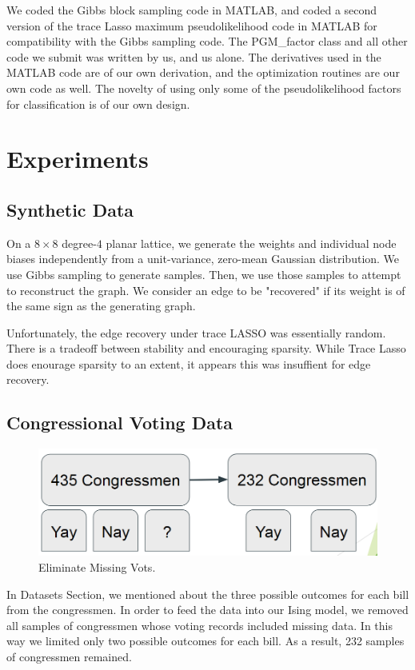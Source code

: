 \documentclass[11pt]{article}
\begin{document}
We coded the Gibbs block sampling code in MATLAB, and coded a second version of the trace Lasso maximum pseudolikelihood code in MATLAB for compatibility with the Gibbs sampling code. The PGM\_factor class and all other code we submit was written by us, and us alone.  The derivatives used in the MATLAB code are of our own derivation, and the optimization routines are our own code as well. The novelty of using only some of the pseudolikelihood factors for classification is of our own design.

\section{Experiments}
\subsection{Synthetic Data}
On a $8\times8$ degree-$4$ planar lattice, we generate the weights and individual node biases independently from a unit-variance, zero-mean Gaussian distribution.
We use Gibbs sampling to generate samples.
Then, we use those samples to attempt to reconstruct the graph. We consider an edge to be "recovered" if its weight is of the same sign as the generating graph.

Unfortunately, the edge recovery under trace LASSO was essentially random. There is a tradeoff between stability and encouraging sparsity. While Trace Lasso does enourage sparsity to an extent, it appears this was insuffient for edge recovery.
  
\subsection{Congressional Voting Data}

\begin{figure}[h!]
\includegraphics[scale=0.5]{Congressmen}
\centering
\caption{Eliminate Missing Vots.}
\end{figure}

In Datasets Section, we mentioned about the three possible outcomes for each bill from the congressmen. In order to feed the data into our Ising model, we removed all samples of congressmen whose voting records included missing data. In this way we limited only two possible outcomes for each bill. As a result,  232 samples of congressmen remained. 
\end{document}
